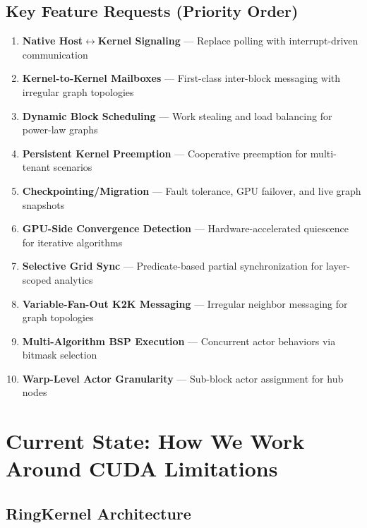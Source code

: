 \documentclass[11pt,a4paper]{article}
\begin{document}
\subsection{Key Feature Requests (Priority Order)}

\begin{enumerate}[leftmargin=*]
    \item \textbf{Native Host$\leftrightarrow$Kernel Signaling} --- Replace polling with interrupt-driven communication
    \item \textbf{Kernel-to-Kernel Mailboxes} --- First-class inter-block messaging with irregular graph topologies
    \item \textbf{Dynamic Block Scheduling} --- Work stealing and load balancing for power-law graphs
    \item \textbf{Persistent Kernel Preemption} --- Cooperative preemption for multi-tenant scenarios
    \item \textbf{Checkpointing/Migration} --- Fault tolerance, GPU failover, and live graph snapshots
    \item \textbf{GPU-Side Convergence Detection} --- Hardware-accelerated quiescence for iterative algorithms
    \item \textbf{Selective Grid Sync} --- Predicate-based partial synchronization for layer-scoped analytics
    \item \textbf{Variable-Fan-Out K2K Messaging} --- Irregular neighbor messaging for graph topologies
    \item \textbf{Multi-Algorithm BSP Execution} --- Concurrent actor behaviors via bitmask selection
    \item \textbf{Warp-Level Actor Granularity} --- Sub-block actor assignment for hub nodes
\end{enumerate}

\section{Current State: How We Work Around CUDA Limitations}

\subsection{RingKernel Architecture}
\end{document}
